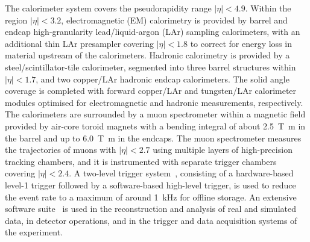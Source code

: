 The calorimeter system covers the pseudorapidity range $|\eta| < 4.9$. Within the region $|\eta|< 3.2$, electromagnetic (EM) calorimetry is provided by barrel and endcap high-granularity lead/liquid-argon (LAr) sampling calorimeters, with an additional thin LAr presampler covering $|\eta| < 1.8$ to correct for energy loss in material upstream of the calorimeters. Hadronic calorimetry is provided by %
a steel/scintillator-tile calorimeter, segmented into three barrel structures within $|\eta| < 1.7$, and two copper/LAr hadronic endcap calorimeters.
The solid angle coverage is completed with forward copper/LAr and tungsten/LAr calorimeter modules optimised for electromagnetic and hadronic measurements, respectively.
The calorimeters are surrounded by a muon spectrometer within a magnetic field provided by air-core toroid magnets with a bending integral of about \SI{2.5}{\tesla\metre} in the barrel and up to \SI{6.0}{\tesla\metre} in the endcaps. 
The muon spectrometer measures the trajectories of muons with $|\eta|<2.7$ using multiple layers of high-precision tracking chambers, and it is instrumented with separate trigger chambers covering $|\eta|<2.4$. A two-level trigger system~\cite{Aaboud:2016leb}, consisting of a hardware-based level-1 trigger followed by a software-based high-level trigger, is used to reduce the event rate to a maximum of around \SI{1}{\kHz} for offline storage.
An extensive software suite~\cite{ATL-SOFT-PUB-2021-001} is used in the reconstruction and analysis of real and simulated data, in detector operations, and in the trigger and data acquisition systems of the experiment.
